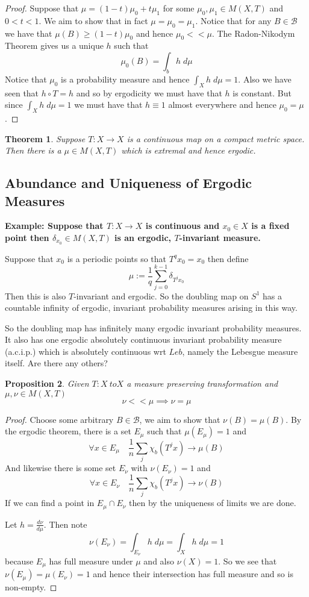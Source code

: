 \documentclass[11pt]{article}
\newcommand{\defeq}{:=}
\newenvironment{eg}
	{\begin{mdframed}[backgroundcolor=mylg,roundcorner=5pt,linewidth=0pt]\bfseries{Example:}\normalfont}
	{\end{mdframed}}
\newtheorem{prop}{Proposition}[section]
\newtheorem{theorem}[prop]{Theorem}
\begin{document}
\begin{proof}
Suppose that $\mu = (1-t)\mu_0 + t\mu_1$ for some $\mu_0, \mu_1\in M(X, T)$ and $0 < t < 1$.
We aim to show that in fact $\mu=\mu_0 = \mu_1$.
Notice that for any $B\in\mathcal{B}$ we have that $\mu(B) \geq (1-t)\mu_0$ and hence $\mu_0 << \mu$.
The Radon-Nikodym Theorem gives us a unique $h$ such that
\[
	\mu_0(B) = \int_b h \; d\mu
\]
Notice that $\mu_0$ is a probability measure and hence $\int_X h \; d\mu = 1$.
Also we have seen that $h\circ T = h$ and so by ergodicity we must have that $h$ is constant.
But since $\int_X h \; d\mu=1$ we must have that $h\equiv 1 $ almost everywhere and hence $\mu_0 = \mu$.
\end{proof}

\begin{theorem}
Suppose $T: X \to X$ is a continuous map on a compact metric space.
Then there is a $\mu\in M(X, T)$ which is extremal and hence ergodic.
\end{theorem}

\subsection{Abundance and Uniqueness of Ergodic Measures}
\begin{eg}
	Suppose that $T:X \to X$ is continuous and $x_0\in X$ is a fixed point then $\delta_{x_0}\in M(X, T)$ is an ergodic, $T$-invariant measure.

	Suppose that $x_0$ is a periodic points so that $T^qx_0 = x_0$ then define
	\[
		\mu \defeq \frac{1}{q}\sum_{j=0}^{k-1}\delta_{T^jx_0}
	\]
	Then this is also $T$-invariant and ergodic.
	So the doubling map on $S^1$ has a countable infinity of ergodic, invariant probability measures arising in this way.
\end{eg}

So the doubling map has infinitely many ergodic invariant probability measures.
It also has one ergodic absolutely continuous invariant probability measure (a.c.i.p.) which is absolutely continuous wrt $Leb$, namely the Lebesgue measure itself.
Are there any others?

\begin{prop}
Given $T:X\ to X$ a measure preserving transformation and $\mu, \nu \in M(X, T)$
\[
\nu << \mu \implies \nu = \mu
\]
\end{prop}

\begin{proof}
Choose some arbitrary $B\in \mathcal{B}$, we aim to show that $\nu(B)=\mu(B)$.
By the ergodic theorem, there is a set $E_\mu$ such that $\mu(E_\mu)=1$ and
\[
	\forall x \in E_\mu \quad \frac{1}{n}\sum_{j}\chi_b(T^jx)\to \mu(B)
\]
And likewise there is some set $E_\nu$ with $\nu(E_\nu) = 1$ and
\[
	\forall x \in E_\nu \quad \frac{1}{n}\sum_{j}\chi_b(T^jx)\to \nu(B)
\]
If we can find a point in $E_\mu \cap E_\nu$ then by the uniqueness of limits we are done.

Let $h=\frac{d\nu}{d\mu}$.
Then note
\[
	\nu(E_\nu) = \int_{E_\nu}h\; d\mu = \int_X h \; d\mu = 1
\]
because $E_\mu$ has full measure under $\mu$ and also $\nu(X)=1$.
So we see that $\nu(E_\mu)=\mu(E_\nu)=1$ and hence their intersection has full measure and so is non-empty.
\end{proof}
\end{document}
